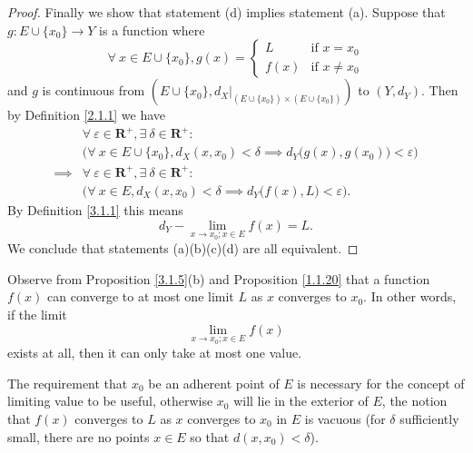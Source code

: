 \begin{proof}
    Finally we show that statement (d) implies statement (a).
    Suppose that \(g : E \cup \{x_0\} \to Y\) is a function where
    \[
        \forall\ x \in E \cup \{x_0\}, g(x) = \begin{cases}
            L    & \text{if } x = x_0    \\
            f(x) & \text{if } x \neq x_0
        \end{cases}
    \]
    and \(g\) is continuous from \((E \cup \{x_0\}, d_X|_{(E \cup \{x_0\}) \times (E \cup \{x_0\})})\) to \((Y, d_Y)\).
    Then by Definition \ref{2.1.1} we have
    \begin{align*}
                 & \forall\ \varepsilon \in \mathbf{R}^+, \exists\ \delta \in \mathbf{R}^+ :                                      \\
                 & \Big(\forall\ x \in E \cup \{x_0\}, d_X(x, x_0) < \delta \implies d_Y\big(g(x), g(x_0)\big) < \varepsilon\Big) \\
        \implies & \forall\ \varepsilon \in \mathbf{R}^+, \exists\ \delta \in \mathbf{R}^+ :                                      \\
                 & \Big(\forall\ x \in E, d_X(x, x_0) < \delta \implies d_Y\big(f(x), L\big) < \varepsilon\Big).
    \end{align*}
    By Definition \ref{3.1.1} this means
    \[
        d_Y - \lim_{x \to x_0 ; x \in E} f(x) = L.
    \]
    We conclude that statements (a)(b)(c)(d) are all equivalent.
\end{proof}

\begin{remark}\label{3.1.6}
    Observe from Proposition \ref{3.1.5}(b) and Proposition \ref{1.1.20} that a function \(f(x)\) can converge to at most one limit \(L\) as \(x\) converges to \(x_0\).
    In other words, if the limit
    \[
        \lim_{x \to x_0 ; x \in E} f(x)
    \]
    exists at all, then it can only take at most one value.
\end{remark}

\begin{remark}\label{3.1.7}
    The requirement that \(x_0\) be an adherent point of \(E\) is necessary for the concept of limiting value to be useful, otherwise \(x_0\) will lie in the exterior of \(E\), the notion that \(f(x)\) converges to \(L\) as \(x\) converges to \(x_0\) in \(E\) is vacuous
    (for \(\delta\) sufficiently small, there are no points \(x \in E\) so that \(d(x, x_0) < \delta\)).
\end{remark}

